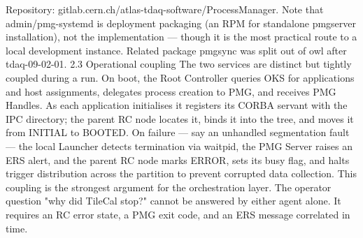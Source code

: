 Repository: gitlab.cern.ch/atlas-tdaq-software/ProcessManager. Note that admin/pmg-systemd is deployment packaging (an RPM for standalone pmgserver installation), not the implementation — though it is the most practical route to a local development instance. Related package pmgsync was split out of owl after tdaq-09-02-01.
2.3 Operational coupling
The two services are distinct but tightly coupled during a run.
On boot, the Root Controller queries OKS for applications and host assignments, delegates process creation to PMG, and receives PMG Handles. As each application initialises it registers its CORBA servant with the IPC directory; the parent RC node locates it, binds it into the tree, and moves it from INITIAL to BOOTED.
On failure — say an unhandled segmentation fault — the local Launcher detects termination via waitpid, the PMG Server raises an ERS alert, and the parent RC node marks ERROR, sets its busy flag, and halts trigger distribution across the partition to prevent corrupted data collection.
This coupling is the strongest argument for the orchestration layer. The operator question "why did TileCal stop?" cannot be answered by either agent alone. It requires an RC error state, a PMG exit code, and an ERS message correlated in time.

